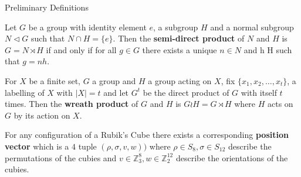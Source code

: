 \documentclass[final]{beamer}
\newlength{\colwidth}
\begin{document}
\begin{frame}[t]
\begin{columns}[t]
\begin{column}{\colwidth}



  \begin{alertblock}{Preliminary Definitions}


     Let $G$ be a group with identity element $e$, a subgroup $H$ and a normal subgroup $N \triangleleft G$ such that $N \cap H = \{e\}$.
    Then the \textbf{semi-direct product} of $N$ and $H$ is $G = N \rtimes H$ if and only if for all $g \in G$ there exists a unique $n \in N$ and h \in H such that $g = nh$.


For $X$ be a finite set, $G$ a group and $H$ a group acting on $X$,
fix $\{x_1,x_2, \dots, x_t\}$, a labelling of $X$ with $| X | = t$ and
let $G^t$ be the direct product of $G$ with itself $t$ times.
Then the \textbf{wreath product} of $G$ and $H$ is $G \wr H = G \rtimes H$ where $H$ acts on $G$ by its action on $X$.







For any configuration of a Rubik's Cube there exists a corresponding \textbf{position vector} which is a $4$ tuple $(\rho, \sigma, v, w))$ where $\rho \in S_8, \sigma \in S_{12}$ describe the permutations of the cubies and $v \in \mathbb{Z}_3^8, w \in \mathbb{Z}_2^{12}$ describe the orientations of the cubies.


\end{alertblock}
\end{column}
\end{columns}
\end{frame}
\end{document}
